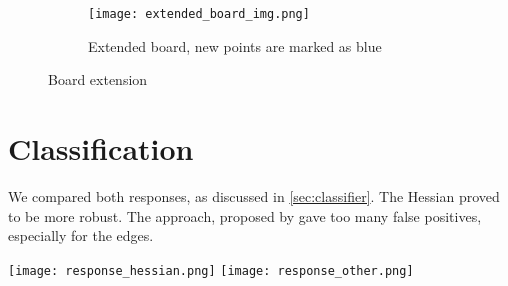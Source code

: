\begin{figure}[h]
	\centering
	\begin{minipage}{0.55\linewidth}
		\begin{subfigure}[b]{\linewidth}
			\texttt{[image: extended\_board\_img.png]}
			\label{fig:extended_board_img}
			\caption{Extended board, new points are marked as blue}
		\end{subfigure}
	\end{minipage}
	\begin{minipage}{0.35\linewidth}
		\vfill
	\end{minipage}
	\caption{Board extension}
\end{figure}

\section{Classification}\label{sec:classification}

\begin{minipage}[t]{0.3\linewidth}
	We compared both responses, as discussed in \cref{sec:classifier}.
	The Hessian proved to be more robust. The approach, proposed by
	\cite{geigerAutomaticCameraRange2012} gave too many false positives,
	especially for the edges.
\end{minipage}
\hfill
\begin{minipage}[t]{0.6\linewidth}
	\texttt{[image: response\_hessian.png]}
	\texttt{[image: response\_other.png]}
\end{minipage}

